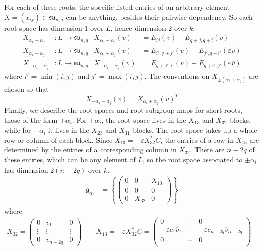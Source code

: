 \documentclass[12pt]{article}
\theoremstyle{definition}
\newcommand{\eps}{\varepsilon}
\newcommand{\lb}{\left\{}
\newcommand{\rb}{\right\}}
\newcommand{\ov}{\overline}
\newcommand{\frakg}{\mathfrak{g}}
\newcommand{\fraksu}{\mathfrak{su}}
\begin{document}
For each of these roots, the specific listed entries of an arbitrary element $X = (x_{ij}) \in \fraksu_{n,q}$ can be anything, besides their pairwise dependency. So each root space has dimension 1 over $L$, hence dimension 2 over $k$.
\begin{align*}
	X_{\alpha_i - \alpha_j}&:L \to \fraksu_{n,q} & X_{\alpha_i -\alpha_j}(v) &= E_{ij}(v) - E_{q+j,q+i}(\ov v) \\
	X_{\alpha_i + \alpha_j}&:L \to \fraksu_{n,q} & X_{\alpha_i + \alpha_j}(v) &= E_{i',q+j'}(v) - E_{j',q+i'}( \eps \ov v) \\
	X_{-\alpha_i - \alpha_j}&:L \to \fraksu_{n,q} & X_{-\alpha_i - \alpha_j}(v) &= E_{q+j',i'}(v) - E_{q+i',j'}(\eps \ov v)
\end{align*}
where $i' = \min(i,j)$ and $j' = \max(i,j)$. The conventions on $X_{\pm (\alpha_i + \alpha_j)}$ are chosen so that
\[
	X_{-\alpha_i - \alpha_j}(v) = X_{\alpha_i + \alpha_j}(v)^T
\]
Finally, we describe the root spaces and root subgroup maps for short roots, those of the form $\pm \alpha_i$. For $+\alpha_i$, the root space lives in the $X_{13}$ and $X_{32}$ blocks, while for $-\alpha_i$ it lives in the $X_{23}$ and $X_{31}$ blocks. The root space takes up a whole row or column of each block. Since $X_{13} = - \eps X_{32}^* C$, the entries of a row in $X_{13}$ are determined by the entries of a corresponding column in $X_{32}$. There are $n-2q$ of these entries, which can be any element of $L$, so the root space associated to $\pm \alpha_i$ has dimension $2(n-2q)$ over $k$.
\begin{align*}
	\frakg_{\alpha_i} &= \lb 
	\begin{pmatrix}
		0 & 0 & X_{13} \\
		0 & 0 & 0 \\
		0 & X_{32} & 0
	\end{pmatrix}
	\rb
\end{align*}
where
\begin{align*}
	X_{32} =
	\begin{pmatrix}
		0 & v_1 & 0 \\
		\vdots & \vdots & \vdots \\
		0 & v_{n-2q} & 0
	\end{pmatrix}
	\qquad
	X_{13} = - \eps X_{32}^* C =
	\begin{pmatrix}
		0 & \cdots & 0 \\
		- \eps c_1 \ov v_1 & \cdots & - \eps c_{n-2q} \ov v_{n-2q} \\
		0 & \cdots & 0 \\
	\end{pmatrix}
	\qquad
\end{align*}
\end{document}
